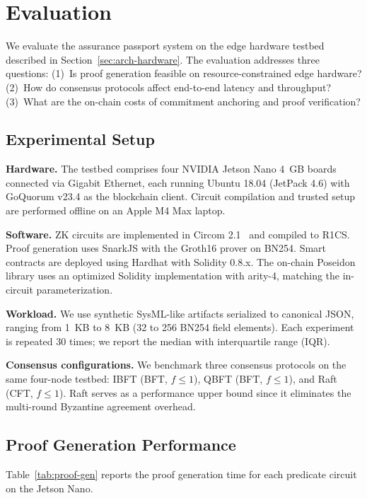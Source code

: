 \section{Evaluation}
\label{sec:evaluation}

We evaluate the assurance passport system on the edge hardware testbed described in Section~\ref{sec:arch-hardware}.
The evaluation addresses three questions:
(1)~Is proof generation feasible on resource-constrained edge hardware?
(2)~How do consensus protocols affect end-to-end latency and throughput?
(3)~What are the on-chain costs of commitment anchoring and proof verification?

\subsection{Experimental Setup}
\label{sec:eval-setup}

\textbf{Hardware.}
The testbed comprises four NVIDIA Jetson Nano 4~GB boards connected via Gigabit Ethernet, each running Ubuntu 18.04 (JetPack 4.6) with GoQuorum v23.4 as the blockchain client.
Circuit compilation and trusted setup are performed offline on an Apple M4 Max laptop.

\textbf{Software.}
ZK circuits are implemented in Circom 2.1~\cite{belles2023circom} and compiled to R1CS.
Proof generation uses SnarkJS with the Groth16 prover on BN254.
Smart contracts are deployed using Hardhat with Solidity 0.8.x.
The on-chain Poseidon library uses an optimized Solidity implementation with arity-4, matching the in-circuit parameterization.

\textbf{Workload.}
We use synthetic SysML-like artifacts serialized to canonical JSON, ranging from 1~KB to 8~KB (32 to 256 BN254 field elements).
Each experiment is repeated 30 times; we report the median with interquartile range (IQR).

\textbf{Consensus configurations.}
We benchmark three consensus protocols on the same four-node testbed: IBFT (BFT, $f \leq 1$), QBFT (BFT, $f \leq 1$), and Raft (CFT, $f \leq 1$).
Raft serves as a performance upper bound since it eliminates the multi-round Byzantine agreement overhead.

\subsection{Proof Generation Performance}
\label{sec:eval-proof}

Table~\ref{tab:proof-gen} reports the proof generation time for each predicate circuit on the Jetson Nano.


